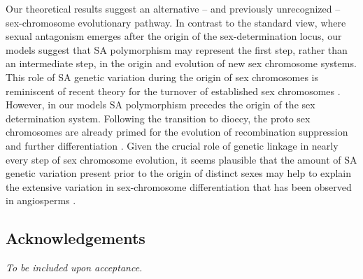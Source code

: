 \documentclass{article}
\newcommand\hl[1]{%
  \bgroup
  \hskip0pt\color{blue!80!black}%
  #1%
  \egroup
}
\begin{document}
Our theoretical results suggest an alternative -- and previously unrecognized -- sex-chromosome evolutionary pathway. \hl{In contrast to the standard view, where sexual antagonism emerges after the origin of the sex-determination locus, our models suggest that SA polymorphism may represent the first step, rather than an intermediate step, in the origin and evolution of new sex chromosome systems.} This role of SA genetic variation during the origin of sex chromosomes is reminiscent of recent theory for the turnover of established sex chromosomes \citep{vanDoornKirkpatrick2007,vanDoornKirkpatrick2010}. \hl{However, in our models SA polymorphism precedes the origin of the sex determination system. Following the transition to dioecy, the proto sex chromosomes are already primed} for the evolution of recombination suppression and further differentiation \citep{Charlesworth1978a,Rice1987,Bachtrog2006,Qiuetal2013}. Given the crucial role of genetic linkage in nearly every step of sex chromosome evolution, it seems plausible that the amount of SA genetic variation present prior to the origin of distinct sexes may help to explain the extensive variation in sex-chromosome differentiation that has been observed in angiosperms \citep{Charlesworth2002,Renner2014,Bachtrog2014}.


\subsection*{Acknowledgements}
\textit{To be included upon acceptance.}




\newpage


\end{document}
